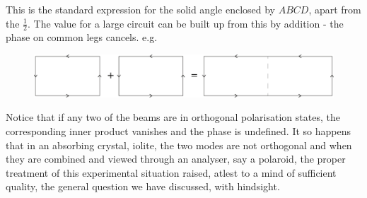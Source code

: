 This is the standard expression for the solid angle enclosed by $ABCD$, apart
from the $\frac{1}{2}$. The value for a large circuit can be built up from this by addition -
the phase on common legs cancels. e.g.
\begin{figure}[H]
\centering
\includegraphics[scale=0.18]{src/images/chap26/13.jpg}
\end{figure}

Notice that if any two of the beams are in orthogonal polarisation states, the
corresponding inner product vanishes and the phase is undefined. It so happens
that in an absorbing crystal, iolite, the two modes are not orthogonal and when
they are combined and viewed through an analyser, say a polaroid, the proper
treatment of this experimental situation raised, atlest to a mind of sufficient
quality, the general question we have discussed, with hindsight.

